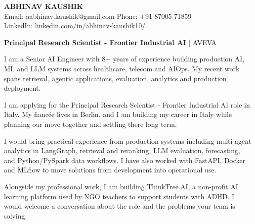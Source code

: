 \documentclass[10pt,a4paper]{article}
\begin{document}
\begin{center}
{\Large\bfseries ABHINAV KAUSHIK}\\[1pt]
Email: aabhinav.kaushik@gmail.com \quad Phone: +91 87005 71859\\
LinkedIn: linkedin.com/in/abhinav-kaushik10/
\end{center}
\vspace{10pt}
\textbf{Principal Research Scientist - Frontier Industrial AI} | AVEVA\par\vspace{8pt}
I am a Senior AI Engineer with 8+ years of experience building production AI, ML and LLM systems across healthcare, telecom and AIOps. My recent work spans retrieval, agentic applications, evaluation, analytics and production deployment.

I am applying for the Principal Research Scientist - Frontier Industrial AI role in Italy. My fiancée lives in Berlin, and I am building my career in Italy while planning our move together and settling there long term.

I would bring practical experience from production systems including multi-agent analytics in LangGraph, retrieval and reranking, LLM evaluation, forecasting, and Python/PySpark data workflows. I have also worked with FastAPI, Docker and MLflow to move solutions from development into operational use.

Alongside my professional work, I am building ThinkTree.AI, a non-profit AI learning platform used by NGO teachers to support students with ADHD. I would welcome a conversation about the role and the problems your team is solving.
\end{document}
